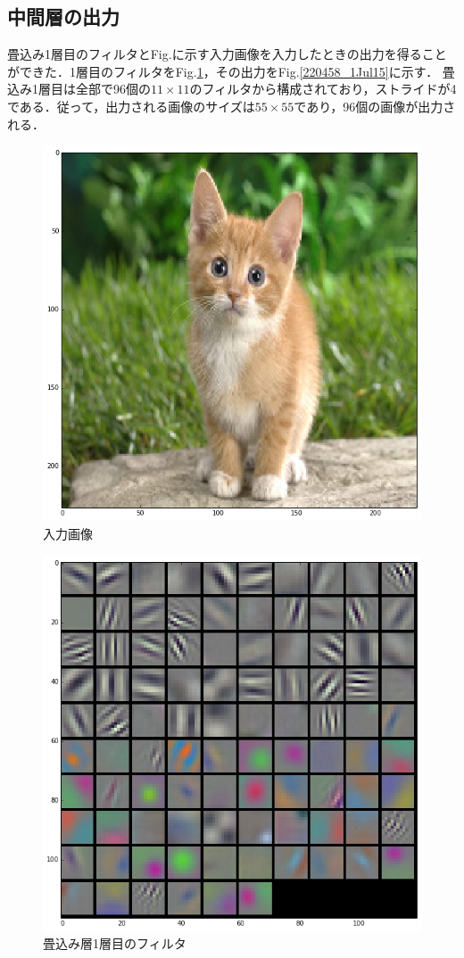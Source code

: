 \documentclass[a4paper,10pt]{jsarticle}
\begin{document}
\subsection{中間層の出力}
畳込み1層目のフィルタとFig.に示す入力画像を入力したときの出力を得ることができた．1層目のフィルタをFig.\ref{220453_1Jul15}，その出力をFig.\ref{220458_1Jul15}に示す．
畳込み1層目は全部で96個の$11\times11$のフィルタから構成されており，ストライドが4である．従って，出力される画像のサイズは$55\times55$であり，96個の画像が出力される．
\begin{figure}[b]
 \centering
 \includegraphics[scale=0.5]{fig/png/input.png}
  \caption{入力画像}
\end{figure}
\begin{figure}[t]
 \centering
 \includegraphics[scale=0.4]{fig/png/conv1_params.png}
  \caption{畳込み層1層目のフィルタ}
  \label{220453_1Jul15}
\end{figure}
\end{document}
